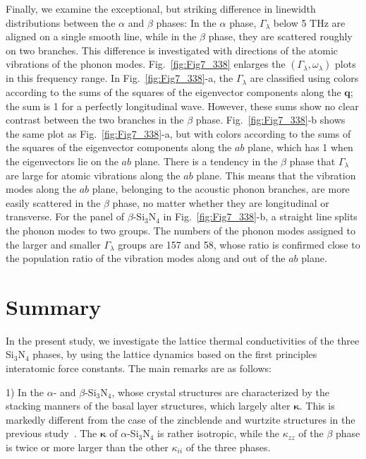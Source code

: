 \documentclass[twocolumn,amsmath,amssymb,a4paper,prb,superscriptaddress,floatfix]{revtex4-1}
\begin{document}
Finally, we examine the exceptional, but striking difference in linewidth
distributions between the $\alpha$ and $\beta$ phases: In the $\alpha$ phase,
$\Gamma_\lambda$ below 5 THz are aligned on a single smooth line, while in the
$\beta$ phase, they are scattered roughly on two branches.  This difference is
investigated with directions of the atomic vibrations of the phonon modes.
Fig.~\ref{fig:Fig7_338} enlarges the $(\Gamma_\lambda,\omega_\lambda)$ plots in
this frequency range. In Fig.~\ref{fig:Fig7_338}-a, the $\Gamma_\lambda$ are
classified using colors according to the sums of the squares of the eigenvector
components along the $\mathbf{q}$; the sum is 1 for a perfectly longitudinal
wave. However, these sums show no clear contrast between the two branches in the
$\beta$ phase.  Fig.~\ref{fig:Fig7_338}-b shows the same plot as
Fig.~\ref{fig:Fig7_338}-a, but with colors according to the sums of the squares
of the eigenvector components along the $ab$ plane, which has 1 when the
eigenvectors lie on the $ab$ plane. There is a tendency in the $\beta$ phase
that  $\Gamma_\lambda$ are large for atomic vibrations along the $ab$ plane.
This means that the vibration modes along the $ab$ plane, belonging to the
acoustic phonon branches, are more easily scattered in the $\beta$ phase, no
matter whether they are longitudinal or transverse. For the panel of
$\beta$-Si$_3$N$_4$ in Fig.~\ref{fig:Fig7_338}-b, a straight line splits the
phonon modes to two groups. The numbers of the phonon modes assigned to the
larger and smaller $\Gamma_\lambda$ groups are 157 and 58, whose ratio is
confirmed close to the population ratio of the vibration modes along and out of
the $ab$ plane.


\section{Summary}

In the present study, we investigate the lattice thermal conductivities of the
three Si$_3$N$_4$ phases, by using the lattice dynamics based on the first
principles interatomic force constants. The main remarks are as follows:

1) In the $\alpha$- and $\beta$-Si$_3$N$_4$, whose crystal structures are
characterized by the stacking manners of the basal layer structures, which
largely alter $\boldsymbol{\kappa}$. This is markedly different from the case of
the zincblende and wurtzite structures in the previous study~\cite{phono3py}.
The $\boldsymbol{\kappa}$ of $\alpha$-Si$_3$N$_4$ is rather isotropic, while the
$\kappa$$_{zz}$ of the $\beta$ phase is twice or more larger than the other
$\kappa_{ii}$ of the three phases.
\end{document}
